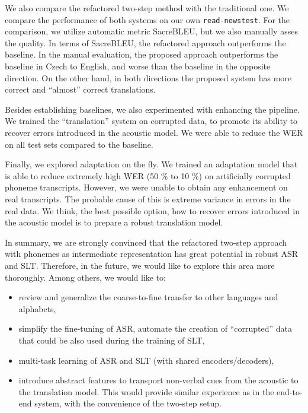 We also compare the refactored two-step method with the traditional one. We compare the performance of both systems on our own \texttt{read-newstest}. For the comparison, we utilize automatic metric SacreBLEU, but we also manually asses the quality. In terms of SacreBLEU, the refactored approach outperforms the baseline. In the manual evaluation, the proposed approach outperforms the baseline in Czech to English, and worse than the baseline in the opposite direction. On the other hand, in both directions the proposed system has more correct and ``almost'' correct translations.

Besides establishing baselines, we also experimented with enhancing the pipeline. We trained the ``translation'' system on corrupted data, to promote its ability to recover errors introduced in the acoustic model. We were able to reduce the WER on all test sets compared to the baseline.

Finally, we explored adaptation on the fly. We trained an adaptation model that is able to reduce extremely high WER (50 \% to 10 \%) on artificially corrupted phoneme transcripts. However, we were unable to obtain any enhancement on real transcripts. The probable cause of this is extreme variance in errors in the real data. We think, the best possible option, how to recover errors introduced in the acoustic model is to prepare a robust translation model. 

In summary, we are strongly convinced that the refactored two-step approach with phonemes as intermediate representation has great potential in robust ASR and SLT. Therefore, in the future, we would like to explore this area more thoroughly. Among others, we would like to:

\begin{itemize}
	\item review and generalize the coarse-to-fine transfer to other languages and alphabets,
	\item simplify the fine-tuning of ASR, automate the creation of ``corrupted'' data that could be also used during the training of SLT,
	\item multi-task learning of ASR and SLT (with shared encoders/decoders),
	\item introduce abstract features to transport non-verbal cues from the acoustic to the translation model. This would provide similar experience as in the end-to-end system, with the convenience of the two-step setup.
\end{itemize}